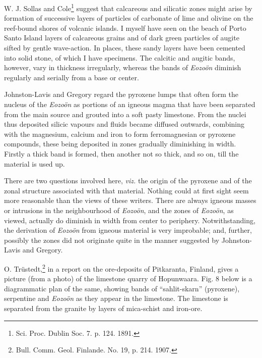 \documentclass[a4paper, 12pt, oneside, landscape]{article}
\begin{document}
W. J. Sollas and Cole\footnote{Sci. Proc. Dublin Soc. 7. p. 124. 1891.} suggest that calcareous and silicatic zones might arise by formation of successive layers of particles of carbonate of lime and olivine on the reef-bound shores of volcanic islands. I myself have seen on the beach of Porto Santo Island layers of calcareous grains and of dark green particles of augite sifted by gentle wave-action. In places, these sandy layers have been cemented into solid stone, of which I have specimens. The calcitic and augitic bands, however, vary in thickness irregularly, whereas the bands of \emph{Eozoön} diminish regularly and serially from a base or center.

Johnston-Lavis and Gregory regard the pyroxene lumps that often form the nucleus of the \emph{Eozoön} as portions of an igneous magma that have been separated from the main source and grouted into a soft pasty limestone. From the nuclei thus deposited silicic vapours and fluids became diffused outwards, combining with the magnesium, calcium and iron to form ferromagnesian or pyroxene compounds, these being deposited in zones gradually diminishing in width. Firstly a thick band is formed, then another not so thick, and so on, till the material is used up.

There are two questions involved here, \emph{viz.} the origin of the pyroxene and of the zonal structure associated with that material. Nothing could at first sight seem more reasonable than the views of these writers. There are always igneous masses or intrusions in the neighbourhood of \emph{Eozoön}, and the zones of \emph{Eozoön}, as viewed, actually do diminish in width from center to periphery. Notwithstanding, the derivation of \emph{Eozoön} from igneous material is very improbable; and, further, possibly the zones did not originate quite in the manner suggested by Johnston-Lavis and Gregory.

O. Trüstedt,\footnote{Bull. Comm. Geol. Finlande. No. 19, p. 214. 1907.} in a report on the ore-deposits of Pitkaranta, Finland, gives a picture (from a photo) of the limestone quarry of Hopunwaara. Fig. 8 below is a diagrammatic plan of the same, showing bands of ``sahlit-skarn'' (pyroxene), serpentine and \emph{Eozoön} as they appear in the limestone. The limestone is separated from the granite by layers of mica-schist and iron-ore. 
\end{document}
